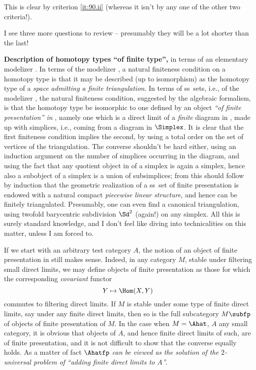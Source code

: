 This is clear by criterion \ref{it:90.ii} (whereas it isn't by any one
of the other two criteria!).

\label{sec:91}%
I see three more questions to review -- presumably they will be a lot
shorter than the last!

\enspace\textbf{Description of homotopy types
  ``of finite type'',} in terms of an elementary modelizer \Ahat. In
terms of the modelizer \Spaces, a natural finiteness condition on a
homotopy type is that it may be described (up to
isomorphism) as the homotopy type of a \emph{space admitting a finite
  triangulation}. In terms of ss~sets, i.e., of the modelizer
\Simplexhat, the natural finiteness condition, suggested by the
algebraic formalism, is that the homotopy type be isomorphic to one
defined by an object \emph{``of finite presentation'' in} \Simplexhat,
namely one which is a direct limit of a \emph{finite} diagram in
\Simplexhat, made up with simplices, i.e., coming from a diagram in
$\Simplex$. It is clear that the first finiteness condition implies
the second, by using a total order on the set of vertices of the
triangulation. The converse shouldn't be hard either, using an
induction argument on the number of simplices occurring in the
diagram, and using the fact that any quotient object in \Simplexhat{}
of a simplex is again a simplex, hence also a subobject of a simplex
is a union of subsimplices; from this should follow by induction that
the geometric realization of a ss~set of finite presentation is
endowed with a natural compact \emph{piecewise linear structure}, and
hence can be finitely triangulated. Presumably, one can even find a
canonical triangulation, using twofold barycentric subdivision $\Sd^2$
(again!) on any simplex. All this is surely standard knowledge, and I
don't feel like diving into technicalities on this matter, unless I am
forced to.

If we start with an arbitrary test category $A$, the notion of an
object of finite presentation in \Ahat{} still makes sense. Indeed, in
any category $M$, stable under filtering small direct limits, we may
define objects of finite presentation as those for which the
corresponding \emph{covariant} functor
\[Y\mapsto \Hom(X,Y)\]
commutes to filtering direct limits. If $M$ is stable under some type
of finite direct limits, say under any finite direct limits, then so
is the full subcategory $M\subfp$ of objects of finite presentation of
$M$. In the case when $M=\Ahat$, $A$ any small category, it is obvious
that objects of $A$, and hence finite direct limits of such, are of
finite presentation, and it is not difficult to show that the converse
equally holds. As a matter of fact $\Ahatfp$ \emph{can be viewed as
  the solution of the $2$-universal problem of ``adding finite direct
  limits to $A$''}.

